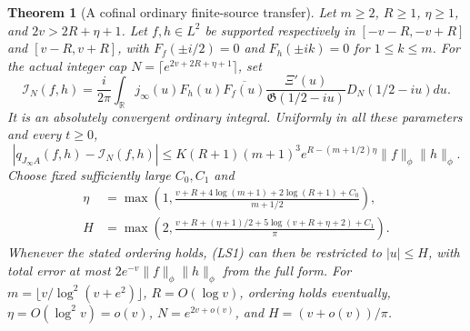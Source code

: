 \documentclass[11pt]{article}
\newtheorem{theorem}{Theorem}
\theoremstyle{remark}\newtheorem{remark}[theorem]{Remark}
\newcommand{\R}{\mathbb R}
\begin{document}
\begin{theorem}[A cofinal ordinary finite-source transfer]
\label{thm:logistic-finite-source}
Let \(m\ge2\), \(R\ge1\), \(\eta\ge1\), and
\(2v>2R+\eta+1\). Let \(f,h\in L^2\) be supported respectively
in \([-v-R,-v+R]\) and \([v-R,v+R]\), with
\(F_f(\pm i/2)=0\) and \(F_h(\pm ik)=0\) for \(1\le k\le m\).
For the actual integer cap
\(N=\lceil e^{2v+2R+\eta+1}\rceil\), set
\[
 \mathcal I_N(f,h)=\frac{i}{2\pi}\int_\R
 j_\infty(u)F_h(u)\overline{F_f(u)}
          \frac{\Xi'(u)}{\mathfrak G(1/2-iu)}D_N(1/2-iu)du.
                                                               \tag{LS1}
\]
It is an absolutely convergent ordinary integral. Uniformly in
all these parameters and every \(t\ge0\),
\[
 |q_{J_\infty A}(f,h)-\mathcal I_N(f,h)|
 \le K(R+1)(m+1)^3e^{R-(m+1/2)\eta}\|f\|_\phi\|h\|_\phi.
                                                               \tag{LS2}
\]
Choose fixed sufficiently large \(C_0,C_1\) and
\[
 \begin{split}
 \eta&=\max\left(1,
  \frac{v+R+4\log(m+1)+2\log(R+1)+C_0}{m+1/2}\right),\\
 H&=\max\left(2,
  \frac{v+R+(\eta+1)/2+5\log(v+R+\eta+2)+C_1}{\pi}\right).
 \end{split}                                                   \tag{LS3}
\]
Whenever the stated ordering holds, (LS1) can then be restricted
to \(|u|\le H\), with total error at most
\(2e^{-v}\|f\|_\phi\|h\|_\phi\) from the full form.
For \(m=\lfloor v/\log^2(v+e^2)\rfloor\), \(R=O(\log v)\),
ordering holds eventually, \(\eta=O(\log^2v)=o(v)\),
\(N=e^{2v+o(v)}\), and \(H=(v+o(v))/\pi\).
\end{theorem}
\end{document}
